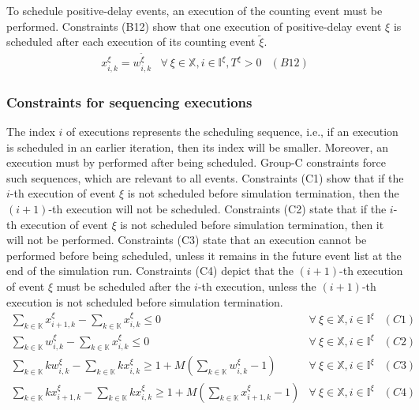 \documentclass[suppldata]{interact}
\theoremstyle{plain}
\theoremstyle{definition}
\theoremstyle{remark}
\begin{document}
To schedule positive-delay events, an execution of the counting event must be performed. Constraints (B12) show that one execution of positive-delay event ${\xi}$ is scheduled after each execution of its counting event ${\tilde{\xi}}$.
\begin{eqnarray}
	x^{\xi}_{i,k} = w^{\tilde{\xi}}_{i,k}&  \forall\ \xi\in \mathbb{X},i\in \mathbb{I}^{\xi}, T^{\xi} > 0&(B12)\nonumber
\end{eqnarray}

\subsubsection{Constraints for sequencing executions}\label{sec:const_C2}
The index $i$ of executions represents the scheduling sequence, i.e., if an execution is scheduled in an earlier iteration, then its index will be smaller. Moreover, an execution must by performed after being scheduled. Group-C constraints force such sequences, which are relevant to all events. Constraints (C1) show that if the $i$-th execution of event $\xi$ is not scheduled before simulation termination, then the $(i+1)$-th execution will not be scheduled. Constraints (C2) state that if the $i$-th execution of event $\xi$ is not scheduled before simulation termination, then it will not be performed. Constraints (C3) state that an execution cannot be performed before being scheduled, unless it remains in the future event list at the end of the simulation run. Constraints (C4) depict that the $(i+1)$-th execution of event $\xi$ must be scheduled after the $i$-th execution, unless the $(i+1)$-th execution is not scheduled before simulation termination.
\begin{eqnarray}
	\sum_{k\in \mathbb{K}} x^{\xi}_{i+1,k} - \sum_{k\in \mathbb{K}} x^{\xi}_{i,k} \le 0&  \forall\ \xi\in \mathbb{X},i\in \mathbb{I}^{\xi}&(C1)\nonumber\\
	\sum_{k\in \mathbb{K}} w^{\xi}_{i,k}-\sum_{k\in \mathbb{K}} x^{\xi}_{i,k} \le 0&  \forall\ \xi\in \mathbb{X},i\in \mathbb{I}^{\xi}&(C2)\nonumber\\
	\sum_{k\in \mathbb{K}} kw^{\xi}_{i,k} - \sum_{k\in \mathbb{K}} kx^{\xi}_{i,k} \ge 1 +M(\sum_{k\in \mathbb{K}} w^{\xi}_{i,k}-1) &\forall\ \xi\in \mathbb{X}, i\in \mathbb{I}^{\xi}&(C3) \nonumber\\
	\sum_{k\in \mathbb{K}} kx^{\xi}_{i+1,k} - \sum_{k\in \mathbb{K}} kx^{\xi}_{i,k} \ge 1+M(\sum_{k\in \mathbb{K}} x^{\xi}_{i+1,k}-1)&  \forall\ \xi\in \mathbb{X},i\in \mathbb{I}^{\xi}&(C4)\nonumber
\end{eqnarray}
\end{document}
